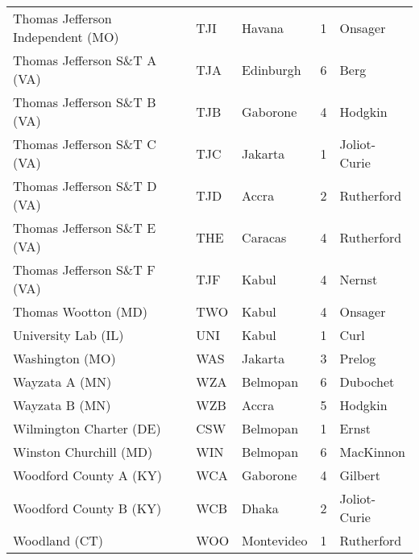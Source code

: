 \documentclass{article}%
\begin{document}
\begin{longtable}{|ll|lc|l|}
Thomas Jefferson Independent (MO)&TJI&Havana&1&Onsager\\%
Thomas Jefferson S\&T A (VA)&TJA&Edinburgh&6&Berg\\%
Thomas Jefferson S\&T B (VA)&TJB&Gaborone&4&Hodgkin\\%
Thomas Jefferson S\&T C (VA)&TJC&Jakarta&1&Joliot{-}Curie\\%
Thomas Jefferson S\&T D (VA)&TJD&Accra&2&Rutherford\\%
Thomas Jefferson S\&T E (VA)&THE&Caracas&4&Rutherford\\%
Thomas Jefferson S\&T F (VA)&TJF&Kabul&4&Nernst\\%
Thomas Wootton (MD)&TWO&Kabul&4&Onsager\\%
University Lab (IL)&UNI&Kabul&1&Curl\\%
Washington (MO)&WAS&Jakarta&3&Prelog\\%
Wayzata A (MN)&WZA&Belmopan&6&Dubochet\\%
Wayzata B (MN)&WZB&Accra&5&Hodgkin\\%
Wilmington Charter (DE)&CSW&Belmopan&1&Ernst\\%
Winston Churchill (MD)&WIN&Belmopan&6&MacKinnon\\%
Woodford County A (KY)&WCA&Gaborone&4&Gilbert\\%
Woodford County B (KY)&WCB&Dhaka&2&Joliot{-}Curie\\%
Woodland (CT)&WOO&Montevideo&1&Rutherford\\%
\end{longtable}%
\end{document}
